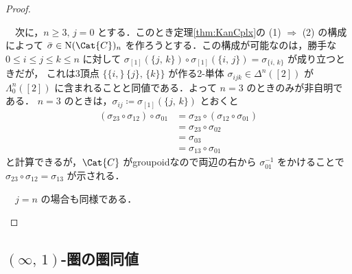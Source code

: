 \documentclass[TQFT_main]{subfiles}
\begin{document}
\begin{proof}
\begin{description}
        　次に，$n \ge 3,\, j=0$ とする．このとき定理\ref{thm:KanCplx}の (1) $\Longrightarrow$ (2) の構成によって $\bar{\sigma} \in \mathrm{N}(\Cat{C})_n$ を作ろうとする．この構成が可能なのは，勝手な $0 \le i \le j \le k \le n$ に対して $\sigma_{[1]} (\{j,\, k\}) \circ \sigma_{[1]} (\{i,\, j\}) = \sigma_{\{i,\, k\}}$ が成り立つときだが，
        これは3頂点 $\bigl\{\{i,\}\, \{j\},\, \{k\}\bigr\}$ が作る2-単体 $\sigma_{ijk} \in \Delta^n([2])$ が $\Lambda^n_0([2])$ に含まれることと同値である．よって $n=3$ のときのみが非自明である．
        $n=3$ のときは，$\sigma_{ij} \coloneqq \sigma_{[1]} (\{j,\, k\})$ とおくと
        \begin{align}
            (\sigma_{23} \circ \sigma_{12}) \circ \sigma_{01}
            &= \sigma_{23} \circ (\sigma_{12} \circ \sigma_{01}) \\
            &= \sigma_{23} \circ \sigma_{02} \\
            &= \sigma_{03} \\
            &= \sigma_{13} \circ \sigma_{01}
        \end{align}
        と計算できるが，$\Cat{C}$ がgroupoidなので両辺の右から $\sigma_{01}^{-1}$ をかけることで $\sigma_{23} \circ \sigma_{12} = \sigma_{13}$ が示される．

        　$j=n$ の場合も同様である．
    \end{description}
    
\end{proof}

\subsection{$(\infty,\, 1)$-圏の圏同値}
\end{document}
